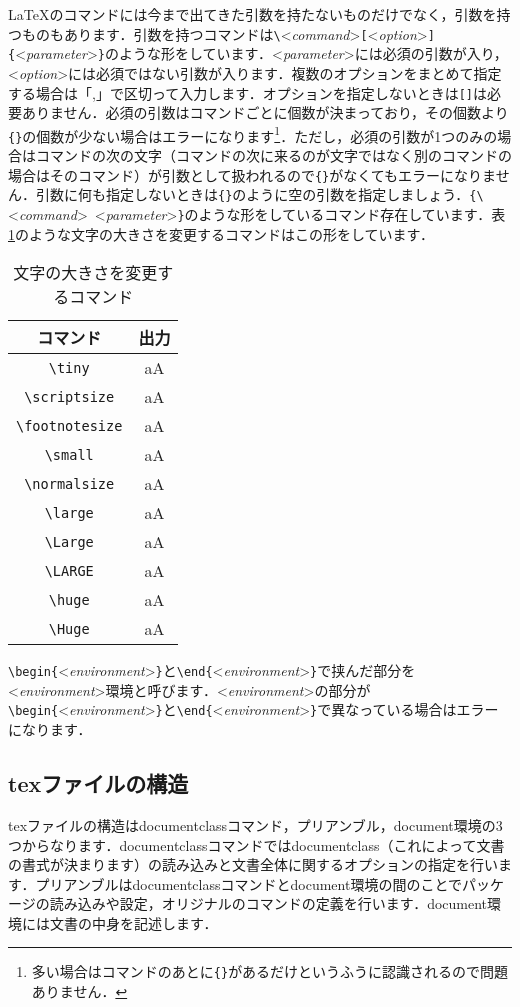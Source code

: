 \LaTeX のコマンドには今まで出てきた引数を持たないものだけでなく，引数を持つものもあります．引数を持つコマンドは\verb*|\|<\textit{command}>\verb*|[|<\textit{option}>\verb*|]{|<\textit{parameter}>\verb*|}|のような形をしています．<\textit{parameter}>には必須の引数が入り，<\textit{option}>には必須ではない引数が入ります．複数のオプションをまとめて指定する場合は「,」で区切って入力します．オプションを指定しないときは\verb*|[]|は必要ありません．必須の引数はコマンドごとに個数が決まっており，その個数より\verb*|{}|の個数が少ない場合はエラーになります\footnote{多い場合はコマンドのあとに\texttt{\{\}}があるだけというふうに認識されるので問題ありません．}．ただし，必須の引数が1つのみの場合はコマンドの次の文字（コマンドの次に来るのが文字ではなく別のコマンドの場合はそのコマンド）が引数として扱われるので\verb*|{}|がなくてもエラーになりません．引数に何も指定しないときは\verb*|{}|のように空の引数を指定しましょう．\verb*|{\|<\textit{command}>\ <\textit{parameter}>\verb*|}|のような形をしているコマンド存在しています．表\ref{ookisa}のような文字の大きさを変更するコマンドはこの形をしています．
\begin{table}
	\centering
	\caption{文字の大きさを変更するコマンド}
	\label{ookisa}
	\begin{tabular}{cc}
		コマンド                  & 出力                 \\ \hline
		\verb*|\tiny|         & {\tiny aA}         \\
		\verb*|\scriptsize|   & {\scriptsize aA}   \\
		\verb*|\footnotesize| & {\footnotesize aA} \\
		\verb*|\small|        & {\small aA}        \\
		\verb*|\normalsize|   & {\normalsize aA}   \\
		\verb*|\large|        & {\large aA}        \\
		\verb*|\Large|        & {\Large aA}        \\
		\verb*|\LARGE|        & {\LARGE aA}        \\
		\verb*|\huge|         & {\huge aA}         \\
		\verb*|\Huge|         & {\Huge aA}
	\end{tabular}
\end{table}

\verb*|\begin{|<\textit{environment}>\verb*|}|と\verb*|\end{|<\textit{environment}>\verb*|}|で挟んだ部分を<\textit{environment}>環境と呼びます．<\textit{environment}>の部分が\verb*|\begin{|<\textit{environment}>\verb*|}|と\verb*|\end{|<\textit{environment}>\verb*|}|で異なっている場合はエラーになります．

\subsection{texファイルの構造}
texファイルの構造はdocumentclassコマンド，プリアンブル，document環境の3つからなります．documentclassコマンドではdocumentclass（これによって文書の書式が決まります）の読み込みと文書全体に関するオプションの指定を行います．プリアンブルはdocumentclassコマンドとdocument環境の間のことでパッケージの読み込みや設定，オリジナルのコマンドの定義を行います．document環境には文書の中身を記述します．